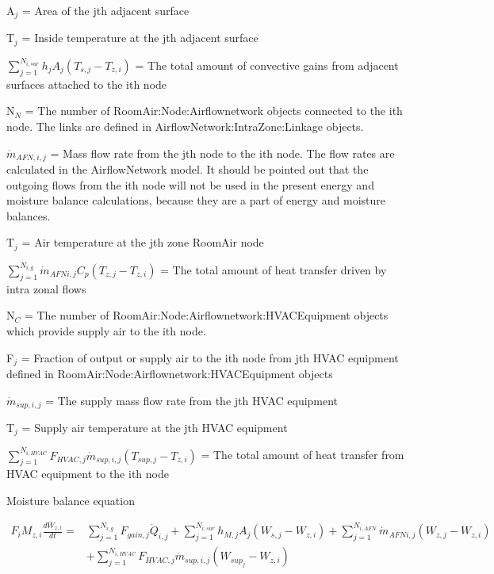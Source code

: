 A\(_{j}\) = Area of the jth adjacent surface

T\(_{j}\) = Inside temperature at the jth adjacent surface

\({\sum\limits_{j = 1}^{N_{i,sur}} h_{j} A_j \left( T_{s,j} - T_{z,i}\right)}\) = The total amount of convective gains from adjacent surfaces attached to the ith node

N\(_{N}\) = The number of RoomAir:Node:Airflownetwork objects connected to the ith node. The links are defined in AirflowNetwork:IntraZone:Linkage objects.

\({\dot m}_{AFN,i,j}\) = Mass flow rate from the jth node to the ith node. The flow rates are calculated in the AirflowNetwork model. It should be pointed out that the outgoing flows from the ith node will not be used in the present energy and moisture balance calculations, because they are a part of energy and moisture balances.

T\(_{j}\) = Air temperature at the jth zone RoomAir node

\({\sum\limits_{j = 1}^{N_{i,g}} \dot m_{AFN i,j} {C_p}\left( T_{z,j} - T_{z,i} \right)}\) = The total amount of heat transfer driven by intra zonal flows

N\(_{C}\) = The number of RoomAir:Node:Airflownetwork:HVACEquipment objects which provide supply air to the ith node.

F\(_{j}\) = Fraction of output or supply air to the ith node from jth HVAC equipment defined in RoomAir:Node:Airflownetwork:HVACEquipment objects

\({\dot m}_{sup,i,j}\) = The supply mass flow rate from the jth HVAC equipment

T\(_{j}\) = Supply air temperature at the jth HVAC equipment

\({\sum\limits_{j = 1}^{N_{i,HVAC}} F_{HVAC,j} \dot m_{sup,i,j} \left( T_{sup,j} - T_{z,i}\right)}\) = The total amount of heat transfer from HVAC equipment to the ith node

Moisture balance equation

\begin{equation}
\begin{split}
{F_i}{M_{z,i}}\frac{{d{W_{z,i}}}}{{dt}} =& \sum\limits_{j = 1}^{{N_{i,g}}} {{F_{gain,j}{\dot Q}_{i,j}}}  + \sum\limits_{j = 1}^{{N_{i,sur}}} {{h_{M,j}}} {A_j}\left( {{W_{s,j}} - {W_{z,i}}} \right) + \sum\limits_{j = 1}^{{N_{i,AFN}}} {{{\dot m}_{AFN i,j}}} \left( {{W_{z,j}} - {W_{z,i}}} \right)\, \\
&+ \sum\limits_{j = 1}^{{N_{i,HVAC}}} {{{F_{HVAC,j}}{\dot m}_{sup,i,j}}} \left( {{W_{sup_j}} - {W_{z,i}}} \right)
\end{split}
\end{equation}

